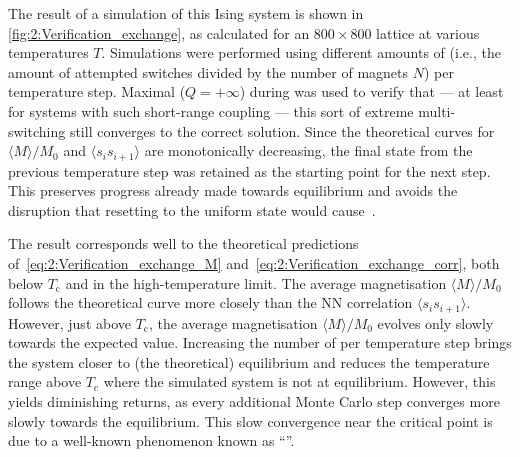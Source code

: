 The result of a \hotspice simulation of this Ising system is shown in \cref{fig:2:Verification_exchange}, as calculated for an $800 \times 800$ lattice at various temperatures $T$.
Simulations were performed using different amounts of  (i.e., the amount of attempted switches divided by the number of magnets $N$) per temperature step.
Maximal  ($Q=+\infty$) during  was used to verify that --- at least for systems with such short-range coupling --- this sort of extreme multi-switching still converges to the correct solution.
Since the theoretical curves for $\langle M \rangle / M_0$ and $\langle s_i s_{i+1} \rangle$ are monotonically decreasing, the final state from the previous temperature step was retained as the starting point for the next step.
This preserves progress already made towards equilibrium and avoids the disruption that resetting to the uniform state would cause~\cite{MCinStatPhys}. \par
The \hotspice result corresponds well to the theoretical predictions of~\cref{eq:2:Verification_exchange_M} and~\cref{eq:2:Verification_exchange_corr}, both below $T_\mathrm{c}$ and in the high-temperature limit.
The average magnetisation $\langle M \rangle / M_0$ follows the theoretical curve more closely than the NN correlation $\langle s_i s_{i+1} \rangle$.
However, just above $T_\mathrm{c}$, the average magnetisation $\langle M \rangle / M_0$ evolves only slowly towards the expected value.
Increasing the number of  per temperature step brings the system closer to (the theoretical) equilibrium and reduces the temperature range above $T_\mathrm{c}$ where the simulated system is not at equilibrium.
However, this yields diminishing returns, as every additional Monte Carlo step converges more slowly towards the equilibrium.
This slow convergence near the critical point is due to a well-known phenomenon known as ``''.


